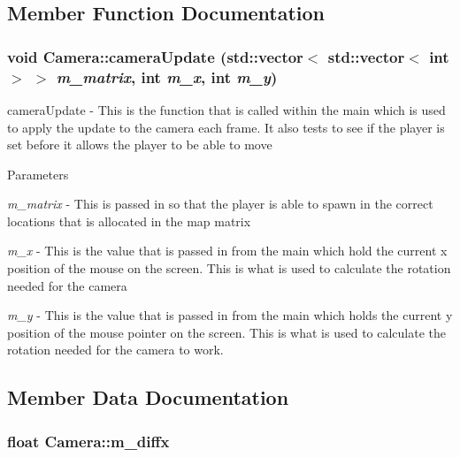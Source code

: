 \subsection{Member Function Documentation}
\hypertarget{classCamera_a501b42a364d591925b732b88233fe5b5}{
\subsubsection[{cameraUpdate}]{\setlength{\rightskip}{0pt plus 5cm}void Camera::cameraUpdate (std::vector$<$ std::vector$<$ int $>$ $>$ {\em m\_\-matrix}, \/  int {\em m\_\-x}, \/  int {\em m\_\-y})}}
\label{classCamera_a501b42a364d591925b732b88233fe5b5}


cameraUpdate -\/ This is the function that is called within the main which is used to apply the update to the camera each frame. It also tests to see if the player is set before it allows the player to be able to move 
\begin{DoxyParams}{Parameters}
\item[{\em m\_\-matrix}]-\/ This is passed in so that the player is able to spawn in the correct locations that is allocated in the map matrix \item[{\em m\_\-x}]-\/ This is the value that is passed in from the main which hold the current x position of the mouse on the screen. This is what is used to calculate the rotation needed for the camera \item[{\em m\_\-y}]-\/ This is the value that is passed in from the main which holds the current y position of the mouse pointer on the screen. This is what is used to calculate the rotation needed for the camera to work. \end{DoxyParams}


\subsection{Member Data Documentation}
\hypertarget{classCamera_a63dbd0a2de940897c695839473b7cdd3}{
\subsubsection[{m\_\-diffx}]{\setlength{\rightskip}{0pt plus 5cm}float {\bf Camera::m\_\-diffx}}}
\label{classCamera_a63dbd0a2de940897c695839473b7cdd3}


